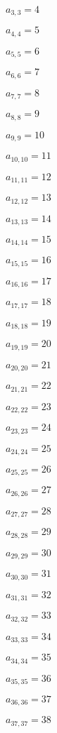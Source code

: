\documentclass[a4paper,12pt]{article}
\begin{document}
$a _{ 3, 3 } = 4$

$a _{ 4, 4 } = 5$

$a _{ 5, 5 } = 6$

$a _{ 6, 6 } = 7$

$a _{ 7, 7 } = 8$

$a _{ 8, 8 } = 9$

$a _{ 9, 9 } = 10$

$a _{ 10, 10 } = 11$

$a _{ 11, 11 } = 12$

$a _{ 12, 12 } = 13$

$a _{ 13, 13 } = 14$

$a _{ 14, 14 } = 15$

$a _{ 15, 15 } = 16$

$a _{ 16, 16 } = 17$

$a _{ 17, 17 } = 18$

$a _{ 18, 18 } = 19$

$a _{ 19, 19 } = 20$

$a _{ 20, 20 } = 21$

$a _{ 21, 21 } = 22$

$a _{ 22, 22 } = 23$

$a _{ 23, 23 } = 24$

$a _{ 24, 24 } = 25$

$a _{ 25, 25 } = 26$

$a _{ 26, 26 } = 27$

$a _{ 27, 27 } = 28$

$a _{ 28, 28 } = 29$

$a _{ 29, 29 } = 30$

$a _{ 30, 30 } = 31$

$a _{ 31, 31 } = 32$

$a _{ 32, 32 } = 33$

$a _{ 33, 33 } = 34$

$a _{ 34, 34 } = 35$

$a _{ 35, 35 } = 36$

$a _{ 36, 36 } = 37$

$a _{ 37, 37 } = 38$
\end{document}
